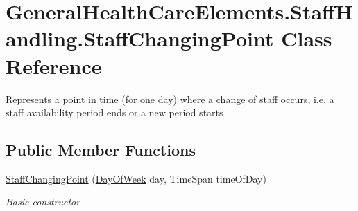 \hypertarget{class_general_health_care_elements_1_1_staff_handling_1_1_staff_changing_point}{}\section{General\+Health\+Care\+Elements.\+Staff\+Handling.\+Staff\+Changing\+Point Class Reference}
\label{class_general_health_care_elements_1_1_staff_handling_1_1_staff_changing_point}


Represents a point in time (for one day) where a change of staff occurs, i.\+e. a staff availability period ends or a new period starts  


\subsection*{Public Member Functions}
\begin{DoxyCompactItemize}
\item 
\hyperlink{class_general_health_care_elements_1_1_staff_handling_1_1_staff_changing_point_ab819f9673e1728f2bfa970695aacbddb}{Staff\+Changing\+Point} (\hyperlink{class_general_health_care_elements_1_1_staff_handling_1_1_staff_changing_point_a0a747e49188fd23d9830876bd79c09da}{Day\+Of\+Week} day, Time\+Span time\+Of\+Day)
\begin{DoxyCompactList}\small\item\em Basic constructor \end{DoxyCompactList}\end{DoxyCompactItemize}
